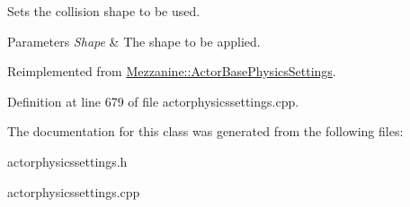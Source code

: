 Sets the collision shape to be used. 


\begin{DoxyParams}{Parameters}
{\em Shape} & The shape to be applied. \\
\hline
\end{DoxyParams}


Reimplemented from \hyperlink{classMezzanine_1_1ActorBasePhysicsSettings_a9aa6c07c9cb235a417d68f1ea417f834}{Mezzanine::ActorBasePhysicsSettings}.



Definition at line 679 of file actorphysicssettings.cpp.



The documentation for this class was generated from the following files:\begin{DoxyCompactItemize}
\item 
actorphysicssettings.h\item 
actorphysicssettings.cpp\end{DoxyCompactItemize}
